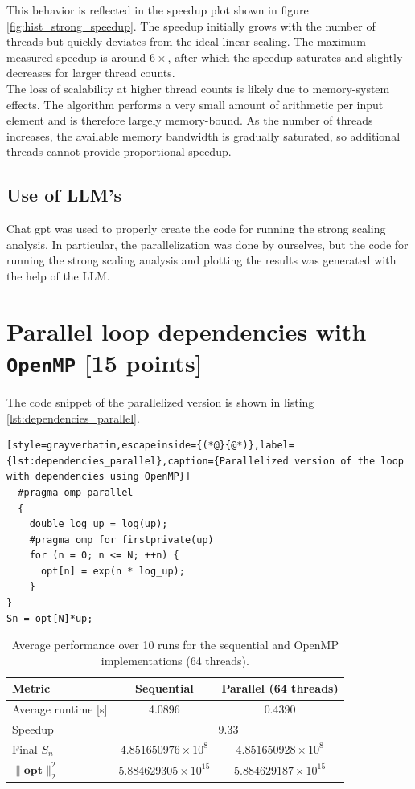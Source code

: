 \documentclass[unicode,10pt,a4paper,oneside,numbers=endperiod,openany]{scrartcl}
\begin{document}
This behavior is reflected in the speedup plot shown in figure \ref{fig:hist_strong_speedup}. The speedup initially grows with the number of threads but quickly deviates from the ideal linear scaling. The maximum measured speedup is around $6\times$, after which the speedup saturates and slightly decreases for larger thread counts.\\

The loss of scalability at higher thread counts is likely due to memory-system effects. The algorithm performs a very small amount of arithmetic per input element and is therefore largely memory-bound. As the number of threads increases, the available memory bandwidth is gradually saturated, so additional threads cannot provide proportional speedup.
\subsection{Use of LLM's}
Chat gpt was used to properly create the code for running the strong scaling analysis. In particular, the parallelization was done by ourselves, but the code for running the strong scaling analysis and plotting the results was generated with the help of the LLM.
\newpage
\section{Parallel loop dependencies with \texttt{OpenMP} [15 points]}
The code snippet of the parallelized version is shown in listing \ref{lst:dependencies_parallel}.
\begin{lstlisting}[style=grayverbatim,escapeinside={(*@}{@*)},label={lst:dependencies_parallel},caption={Parallelized version of the loop with dependencies using OpenMP}]
  #pragma omp parallel
  {
    double log_up = log(up);
    #pragma omp for firstprivate(up)
    for (n = 0; n <= N; ++n) {
      opt[n] = exp(n * log_up);
    }
}
Sn = opt[N]*up;
\end{lstlisting}
\begin{table}[!h]
\centering
\caption{Average performance over 10 runs for the sequential and OpenMP implementations (64 threads).}
\begin{tabular}{lcc}
\hline
Metric & Sequential & Parallel (64 threads) \\
\hline
Average runtime [s] & 4.0896 & 0.4390 \\
Speedup & \multicolumn{2}{c}{9.33} \\
Final $S_n$ & $4.851650976\times10^{8}$ & $4.851650928\times10^{8}$ \\
$\|\mathbf{opt}\|_2^2$ & $5.884629305\times10^{15}$ & $5.884629187\times10^{15}$ \\
\hline
\end{tabular}
\label{tab:dependencies_results}
\end{table}
\end{document}
